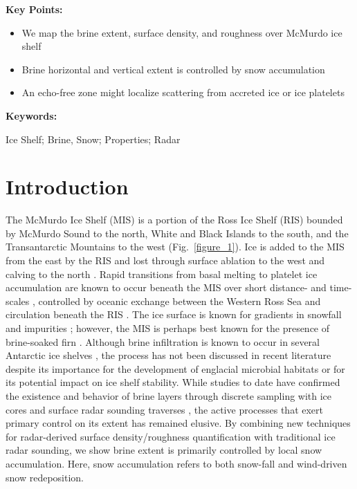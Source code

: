 \documentclass[draft,grl]{agutex}
\begin{document}
%
%

\begin{article}

\textbf{Key Points:}
\begin{itemize}
  \item We map the brine extent, surface density, and roughness over McMurdo ice shelf
  \item Brine horizontal and vertical extent is controlled by snow accumulation
  \item An echo-free zone might localize scattering from accreted ice or ice platelets
\end{itemize}

\textbf{Keywords:}

Ice Shelf; Brine, Snow; Properties; Radar

%
%

\section{Introduction}

The McMurdo Ice Shelf (MIS) is a portion of the Ross Ice Shelf (RIS) bounded by McMurdo Sound to the north, White and Black Islands to the south, and the Transantarctic Mountains to the west (Fig.~\ref{figure_1}). Ice is added to the MIS from the east by the RIS and lost through surface ablation to the west and calving to the north \citep{Glasser-2014-ID1003}. Rapid transitions from basal melting to platelet ice accumulation are known to occur beneath the MIS over short distance- and time-scales \citep{Robinson-2010-ID903,Rack-2013-ID898}, controlled by oceanic exchange between the Western Ross Sea and circulation beneath the RIS \citep{Robinson-2010-ID903,Stern-2013-ID1044}. The ice surface is known for gradients in snowfall \citep{Heine-1967-ID994} and impurities \citep{Glasser-2006-ID985,Rack-2013-ID898}; however, the MIS is perhaps best known for the presence of brine-soaked firn \citep[e.g.][]{Stuart-1962-ID1045}. Although brine infiltration is known to occur in several Antarctic ice shelves \citep[e.g.][]{Dubrovin-1962-ID1046,EwenSmith-1971-ID1047,Thomas-1973-ID1048}, the process has not been discussed in recent literature despite its importance for the development of englacial microbial habitats or for its potential impact on ice shelf stability. While studies to date have confirmed the existence and behavior of brine layers through discrete sampling with ice cores \citep{Heine-1968-ID698} and surface radar sounding traverses \citep[e.g.][]{Kovacs-1975-ID702,Morse-1994-ID696}, the active processes that exert primary control on its extent has remained elusive. By combining new techniques for radar-derived surface density/roughness quantification with traditional ice radar sounding, we show brine extent is primarily controlled by local snow accumulation. Here, snow accumulation refers to both snow-fall and wind-driven snow redeposition.


\end{article}
\end{document}
